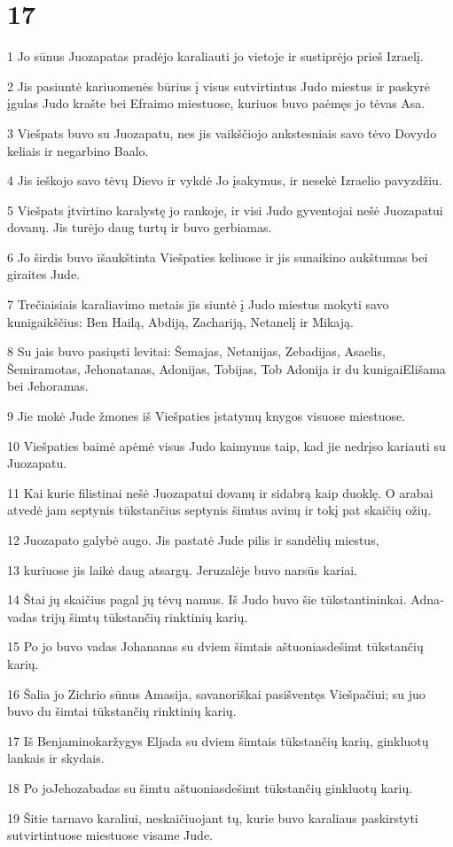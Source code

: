 \chapter{17}


\par 1 Jo sūnus Juozapatas pradėjo karaliauti jo vietoje ir sustiprėjo prieš Izraelį. 
\par 2 Jis pasiuntė kariuomenės būrius į visus sutvirtintus Judo miestus ir paskyrė įgulas Judo krašte bei Efraimo miestuose, kuriuos buvo paėmęs jo tėvas Asa. 
\par 3 Viešpats buvo su Juozapatu, nes jis vaikščiojo ankstesniais savo tėvo Dovydo keliais ir negarbino Baalo. 
\par 4 Jis ieškojo savo tėvų Dievo ir vykdė Jo įsakymus, ir nesekė Izraelio pavyzdžiu. 
\par 5 Viešpats įtvirtino karalystę jo rankoje, ir visi Judo gyventojai nešė Juozapatui dovanų. Jis turėjo daug turtų ir buvo gerbiamas. 
\par 6 Jo širdis buvo išaukštinta Viešpaties keliuose ir jis sunaikino aukštumas bei giraites Jude. 
\par 7 Trečiaisiais karaliavimo metais jis siuntė į Judo miestus mokyti savo kunigaikščius: Ben Hailą, Abdiją, Zachariją, Netanelį ir Mikają. 
\par 8 Su jais buvo pasiųsti levitai: Šemajas, Netanijas, Zebadijas, Asaelis, Šemiramotas, Jehonatanas, Adonijas, Tobijas, Tob Adonija ir du kunigai­Elišama bei Jehoramas. 
\par 9 Jie mokė Jude žmones iš Viešpaties įstatymų knygos visuose miestuose. 
\par 10 Viešpaties baimė apėmė visus Judo kaimynus taip, kad jie nedrįso kariauti su Juozapatu. 
\par 11 Kai kurie filistinai nešė Juozapatui dovanų ir sidabrą kaip duoklę. O arabai atvedė jam septynis tūkstančius septynis šimtus avinų ir tokį pat skaičių ožių. 
\par 12 Juozapato galybė augo. Jis pastatė Jude pilis ir sandėlių miestus, 
\par 13 kuriuose jis laikė daug atsargų. Jeruzalėje buvo narsūs kariai. 
\par 14 Štai jų skaičius pagal jų tėvų namus. Iš Judo buvo šie tūkstantininkai. Adna­vadas trijų šimtų tūkstančių rinktinių karių. 
\par 15 Po jo buvo vadas Johananas su dviem šimtais aštuoniasdešimt tūkstančių karių. 
\par 16 Šalia jo Zichrio sūnus Amasija, savanoriškai pasišventęs Viešpačiui; su juo buvo du šimtai tūkstančių rinktinių karių. 
\par 17 Iš Benjamino­karžygys Eljada su dviem šimtais tūkstančių karių, ginkluotų lankais ir skydais. 
\par 18 Po jo­Jehozabadas su šimtu aštuoniasdešimt tūkstančių ginkluotų karių. 
\par 19 Šitie tarnavo karaliui, neskaičiuojant tų, kurie buvo karaliaus paskirstyti sutvirtintuose miestuose visame Jude.



